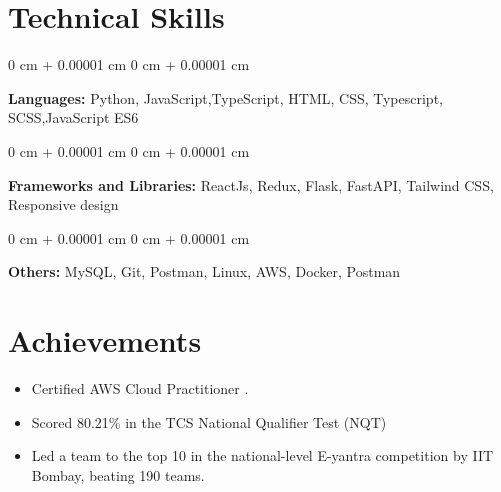 \documentclass[10pt, letterpaper]{article}
\newenvironment{highlightsforbulletentries}{
    \begin{itemize}[
        topsep=0.10 cm,
        parsep=0.10 cm,
        partopsep=0pt,
        itemsep=0pt,
        leftmargin=10pt
    ]
}{
    \end{itemize}
} %
\newenvironment{onecolentry}{
    \begin{adjustwidth}{
        0 cm + 0.00001 cm
    }{
        0 cm + 0.00001 cm
    }
}{
    \end{adjustwidth}
} %
\begin{document}






    \section{Technical Skills}
        
        \begin{onecolentry}
            \textbf{Languages:} Python, JavaScript,TypeScript,  HTML, CSS, Typescript, SCSS,JavaScript ES6
        \end{onecolentry}

        \vspace{0.2 cm}

        \begin{onecolentry}
            \textbf{Frameworks and Libraries:} ReactJs, Redux, Flask, FastAPI, Tailwind CSS, Responsive design
        \end{onecolentry}

        \vspace{0.2 cm}

        \begin{onecolentry}
            \textbf{Others:} MySQL, Git, Postman, Linux, AWS, Docker, Postman
        \end{onecolentry}

        \vspace{0.2 cm}

    
    \section{Achievements}
  
        \begin{highlightsforbulletentries}
            \item Certified AWS Cloud Practitioner .
            \item Scored 80.21\% in the TCS National Qualifier Test (NQT)
            \item Led a team to the top 10 in the national-level E-yantra competition by IIT Bombay, beating 190 teams.
        \end{highlightsforbulletentries}
\end{document}
